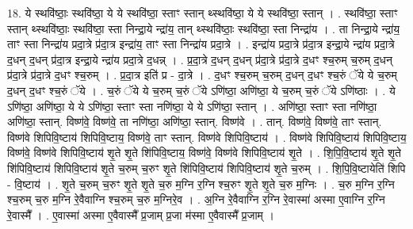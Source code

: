 \documentclass[17pt]{extarticle}
\begin{document}
18. ये स्थवि॑ष्ठाः॒ स्थवि॑ष्ठा॒ ये ये स्थवि॑ष्ठा॒ स्ताꣳ स्तान् थ्स्थवि॑ष्ठा॒ ये ये स्थवि॑ष्ठा॒ स्तान् । . स्थवि॑ष्ठा॒ स्ताꣳ स्तान् थ्स्थवि॑ष्ठाः॒ स्थवि॑ष्ठा॒ स्ता निन्द्रा॒ये न्द्रा॑य॒ तान् थ्स्थवि॑ष्ठाः॒ स्थवि॑ष्ठा॒ स्ता निन्द्रा॑य । . ता निन्द्रा॒ये न्द्रा॑य॒ ताꣳ स्ता निन्द्रा॑य प्रदा॒त्रे प्र॑दा॒त्र इन्द्रा॑य॒ ताꣳ स्ता निन्द्रा॑य प्रदा॒त्रे । . इन्द्रा॑य प्रदा॒त्रे प्र॑दा॒त्र इन्द्रा॒ये न्द्रा॑य प्रदा॒त्रे द॒धन् द॒धन् प्र॑दा॒त्र इन्द्रा॒ये न्द्रा॑य प्रदा॒त्रे द॒धन्न् । . प्र॒दा॒त्रे द॒धन् द॒धन् प्र॑दा॒त्रे प्र॑दा॒त्रे द॒धꣳ श्च॒रुम् च॒रुम् द॒धन् प्र॑दा॒त्रे प्र॑दा॒त्रे द॒धꣳ श्च॒रुम् । . प्र॒दा॒त्र इति॑ प्र - दा॒त्रे । . द॒धꣳ श्च॒रुम् च॒रुम् द॒धन् द॒धꣳ श्च॒रुं ॅये ये च॒रुम् द॒धन् द॒धꣳ श्च॒रुं ॅये । . च॒रुं ॅये ये च॒रुम् च॒रुं ॅये ऽणि॑ष्ठा॒ अणि॑ष्ठा॒ ये च॒रुम् च॒रुं ॅये ऽणि॑ष्ठाः । . ये ऽणि॑ष्ठा॒ अणि॑ष्ठा॒ ये ये ऽणि॑ष्ठा॒ स्ताꣳ स्ता नणि॑ष्ठा॒ ये ये ऽणि॑ष्ठा॒ स्तान् । . अणि॑ष्ठा॒ स्ताꣳ स्ता नणि॑ष्ठा॒ अणि॑ष्ठा॒ स्तान्. विष्ण॑वे॒ विष्ण॑वे॒ ता नणि॑ष्ठा॒ अणि॑ष्ठा॒ स्तान्. विष्ण॑वे । . तान्. विष्ण॑वे॒ विष्ण॑वे॒ ताꣳ स्तान्. विष्ण॑वे शिपिवि॒ष्टाय॑ शिपिवि॒ष्टाय॒ विष्ण॑वे॒ ताꣳ स्तान्. विष्ण॑वे शिपिवि॒ष्टाय॑ । . विष्ण॑वे शिपिवि॒ष्टाय॑ शिपिवि॒ष्टाय॒ विष्ण॑वे॒ विष्ण॑वे शिपिवि॒ष्टाय॑ शृ॒ते शृ॒ते शि॑पिवि॒ष्टाय॒ विष्ण॑वे॒ विष्ण॑वे शिपिवि॒ष्टाय॑ शृ॒ते । . शि॒पि॒वि॒ष्टाय॑ शृ॒ते शृ॒ते शि॑पिवि॒ष्टाय॑ शिपिवि॒ष्टाय॑ शृ॒ते च॒रुम् च॒रुꣳ शृ॒ते शि॑पिवि॒ष्टाय॑ शिपिवि॒ष्टाय॑ शृ॒ते च॒रुम् । . शि॒पि॒वि॒ष्टायेति॑ शिपि - वि॒ष्टाय॑ । . शृ॒ते च॒रुम् च॒रुꣳ शृ॒ते शृ॒ते च॒रु म॒ग्नि र॒ग्नि श्च॒रुꣳ शृ॒ते शृ॒ते च॒रु म॒ग्निः । . च॒रु म॒ग्नि र॒ग्नि श्च॒रुम् च॒रु म॒ग्नि रे॒वैवाग्नि श्च॒रुम् च॒रु म॒ग्निरे॒व । . अ॒ग्नि रे॒वैवाग्नि र॒ग्नि रे॒वास्मा॑ अस्मा ए॒वाग्नि र॒ग्नि रे॒वास्मै᳚ । . ए॒वास्मा॑ अस्मा ए॒वैवास्मै᳚ प्र॒जाम् प्र॒जा म॑स्मा ए॒वैवास्मै᳚ प्र॒जाम् । \newline
\end{document}
